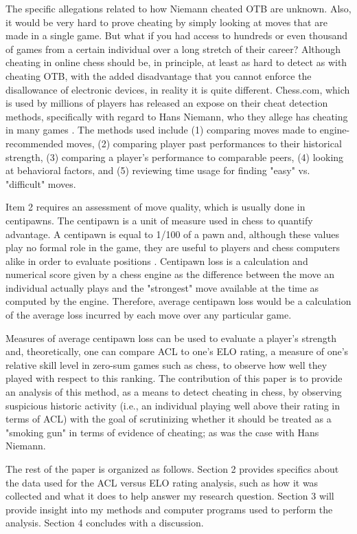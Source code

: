 \documentclass[12pt, letterpaper, titlepage]{article}
\begin{document}
The specific allegations related to how Niemann cheated OTB are unknown. Also, it would be very hard to prove cheating by simply looking at moves that are made in a single game. But what if you had access to hundreds or even thousand of games from a certain individual over a long stretch of their career? Although cheating in online chess should be, in principle, at least as hard to detect as with cheating OTB, with the added disadvantage that you cannot enforce the disallowance of electronic devices, in reality it is quite different. Chess.com, which is used by millions of players has released an expose on their cheat detection methods, specifically with regard to Hans Niemann, who they allege has cheating in many games \citep{erikallebest2022}. The methods used include (1) comparing moves made to engine-recommended moves, (2) comparing player past performances to their historical strength, (3) comparing a player's performance to comparable peers, (4) looking at behavioral factors, and (5) reviewing time usage for finding "easy" vs. "difficult" moves.  

Item 2 requires an assessment of move quality, which is usually done in centipawns. The centipawn is a unit of measure used in chess to quantify advantage. A centipawn is equal to 1/100 of a pawn and, although these values play no formal role in the game, they are useful to players and chess computers alike in order to evaluate positions . Centipawn loss is a calculation and numerical score given by a chess engine as the difference between the move an individual actually plays and the "strongest" move available at the time as computed by the engine. Therefore, average centipawn loss would be a calculation of the average loss incurred by each move over any particular game.

Measures of average centipawn loss can be used to evaluate a player's strength and, theoretically, one can compare ACL to one's ELO rating, a measure of one's relative skill level in zero-sum games such as chess, to observe how well they played with respect to this ranking. The contribution of this paper is to provide an analysis of this method, as a means to detect cheating in chess, by observing suspicious historic activity (i.e., an individual playing well above their rating in terms of ACL) with the goal of scrutinizing whether it should be treated as a "smoking gun" in terms of evidence of cheating; as was the case with Hans Niemann.

The rest of the paper is organized as follows. Section 2 provides specifics about the data used for the ACL versus ELO rating analysis, such as how it was collected and what it does to help answer my research question. Section 3 will provide insight into my methods and computer programs used to perform the analysis. Section 4 concludes with a discussion.
\end{document}
